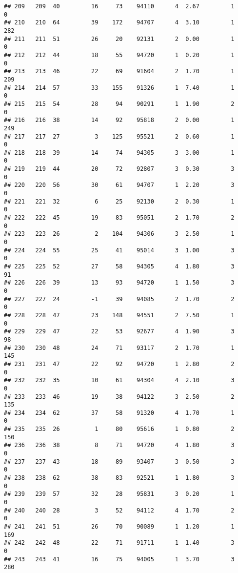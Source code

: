 \documentclass[
]{article}
\begin{document}
\begin{verbatim}
## 209   209  40         16     73    94110      4  2.67         1        0
## 210   210  64         39    172    94707      4  3.10         1      282
## 211   211  51         26     20    92131      2  0.00         1        0
## 212   212  44         18     55    94720      1  0.20         1        0
## 213   213  46         22     69    91604      2  1.70         1      209
## 214   214  57         33    155    91326      1  7.40         1        0
## 215   215  54         28     94    90291      1  1.90         2        0
## 216   216  38         14     92    95818      2  0.00         1      249
## 217   217  27          3    125    95521      2  0.60         1        0
## 218   218  39         14     74    94305      3  3.00         1        0
## 219   219  44         20     72    92807      3  0.30         3        0
## 220   220  56         30     61    94707      1  2.20         3        0
## 221   221  32          6     25    92130      2  0.30         1        0
## 222   222  45         19     83    95051      2  1.70         2        0
## 223   223  26          2    104    94306      3  2.50         1        0
## 224   224  55         25     41    95014      3  1.00         3        0
## 225   225  52         27     58    94305      4  1.80         3       91
## 226   226  39         13     93    94720      1  1.50         3        0
## 227   227  24         -1     39    94085      2  1.70         2        0
## 228   228  47         23    148    94551      2  7.50         1        0
## 229   229  47         22     53    92677      4  1.90         3       98
## 230   230  48         24     71    93117      2  1.70         1      145
## 231   231  47         22     92    94720      1  2.80         2        0
## 232   232  35         10     61    94304      4  2.10         3        0
## 233   233  46         19     38    94122      3  2.50         2      135
## 234   234  62         37     58    91320      4  1.70         1        0
## 235   235  26          1     80    95616      1  0.80         2      150
## 236   236  38          8     71    94720      4  1.80         3        0
## 237   237  43         18     89    93407      3  0.50         3        0
## 238   238  62         38     83    92521      1  1.80         3        0
## 239   239  57         32     28    95831      3  0.20         1        0
## 240   240  28          3     52    94112      4  1.70         2        0
## 241   241  51         26     70    90089      1  1.20         1      169
## 242   242  48         22     71    91711      1  1.40         3        0
## 243   243  41         16     75    94005      1  3.70         3      280

\end{verbatim}
\end{document}
